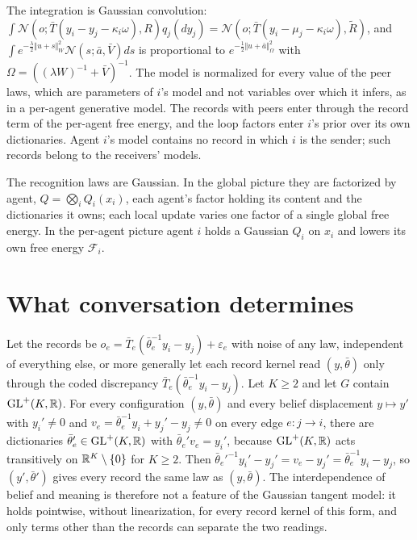 \documentclass[11pt,letterpaper]{report}
\begin{document}
The integration is Gaussian convolution: $\int\mathcal N(o;\bar T(y_i-y_j-\kappa_i\omega),R)q_j(dy_j)=\mathcal N(o;\bar T(y_i-\mu_j-\kappa_i\omega),\tilde R)$, and $\int e^{-\frac\lambda2\Vert u+s\Vert_W^2}\mathcal N(s;\bar a,\bar V)ds$ is proportional to $e^{-\frac12\Vert u+\bar a\Vert_\Omega^2}$ with $\Omega=((\lambda W)^{-1}+\bar V)^{-1}$. The model is normalized for every value of the peer laws, which are parameters of $i$'s model and not variables over which it infers, as in a per-agent generative model. The records with peers enter through the record term of the per-agent free energy, and the loop factors enter $i$'s prior over its own dictionaries. Agent $i$'s model contains no record in which $i$ is the sender; such records belong to the receivers' models.

The recognition laws are Gaussian. In the global picture they are factorized by agent, $Q=\bigotimes_iQ_i(x_i)$, each agent's factor holding its content and the dictionaries it owns; each local update varies one factor of a single global free energy. In the per-agent picture agent $i$ holds a Gaussian $Q_i$ on $x_i$ and lowers its own free energy $\mathcal F_i$.

\chapter{What conversation determines}
\label{it2:ch-identification}

Let the records be $o_e=\bar T_e(\bar\theta_e^{-1}y_i-y_j)+\varepsilon_e$ with noise of any law, independent of everything else, or more generally let each record kernel read $(y,\bar\theta)$ only through the coded discrepancy $\bar T_e(\bar\theta_e^{-1}y_i-y_j)$. Let $K\geq2$ and let $G$ contain $\mathrm{GL}^+(K,\mathbb R)$. For every configuration $(y,\bar\theta)$ and every belief displacement $y\mapsto y'$ with $y_i'\neq0$ and $v_e=\bar\theta_e^{-1}y_i+y_j'-y_j\neq0$ on every edge $e:j\to i$, there are dictionaries $\bar\theta_e'\in\mathrm{GL}^+(K,\mathbb R)$ with $\bar\theta_e'v_e=y_i'$, because $\mathrm{GL}^+(K,\mathbb R)$ acts transitively on $\mathbb R^K\setminus\{0\}$ for $K\geq2$. Then $\bar\theta_e'^{-1}y_i'-y_j'=v_e-y_j'=\bar\theta_e^{-1}y_i-y_j$, so $(y',\bar\theta')$ gives every record the same law as $(y,\bar\theta)$. The interdependence of belief and meaning is therefore not a feature of the Gaussian tangent model: it holds pointwise, without linearization, for every record kernel of this form, and only terms other than the records can separate the two readings.
\end{document}
